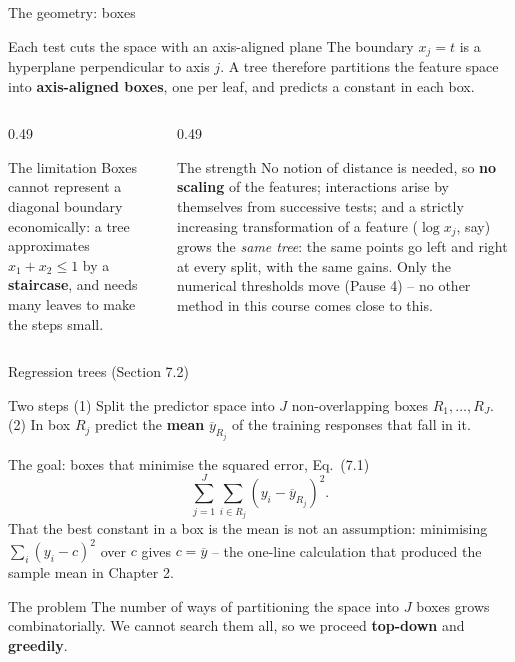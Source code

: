 \documentclass[10pt,aspectratio=169]{beamer}
\begin{document}
\begin{frame}{The geometry: boxes}
\begin{block}{Each test cuts the space with an axis-aligned plane}
The boundary $x_j=t$ is a hyperplane perpendicular to axis $j$.  A tree therefore
partitions the feature space into \textbf{axis-aligned boxes}, one per leaf,
and predicts a constant in each box.
\end{block}
\begin{columns}[T]
\begin{column}{0.49\textwidth}
\begin{block}{The limitation}
Boxes cannot represent a diagonal boundary economically: a tree approximates
$x_1+x_2\le 1$ by a \textbf{staircase}, and needs many leaves to make the
steps small.
\end{block}
\end{column}
\begin{column}{0.49\textwidth}
\begin{block}{The strength}
No notion of distance is needed, so \textbf{no scaling} of the features;
interactions arise by themselves from successive tests; and a strictly
increasing transformation of a feature ($\log x_j$, say) grows the
\emph{same tree}: the same points go left and right at every split, with the
same gains.  Only the numerical thresholds move (Pause 4) -- no other method
in this course comes close to this.
\end{block}
\end{column}
\end{columns}
\end{frame}

\begin{frame}{Regression trees (Section 7.2)}
\begin{block}{Two steps}
(1) Split the predictor space into $J$ non-overlapping boxes $R_1,\dots,R_J$.
(2) In box $R_j$ predict the \textbf{mean} $\overline{y}_{R_j}$ of the training
responses that fall in it.
\end{block}
\begin{block}{The goal: boxes that minimise the squared error, Eq.\ (7.1)}
\[
  \sum_{j=1}^{J}\sum_{i\in R_j}\left(y_i-\overline{y}_{R_j}\right)^{2}.
\]
That the best constant in a box is the mean is not an assumption: minimising
$\sum_i(y_i-c)^2$ over $c$ gives $c=\overline{y}$ -- the one-line calculation
that produced the sample mean in Chapter 2.
\end{block}
\begin{block}{The problem}
The number of ways of partitioning the space into $J$ boxes grows
combinatorially.  We cannot search them all, so we proceed \textbf{top-down}
and \textbf{greedily}.
\end{block}
\end{frame}
\end{document}
